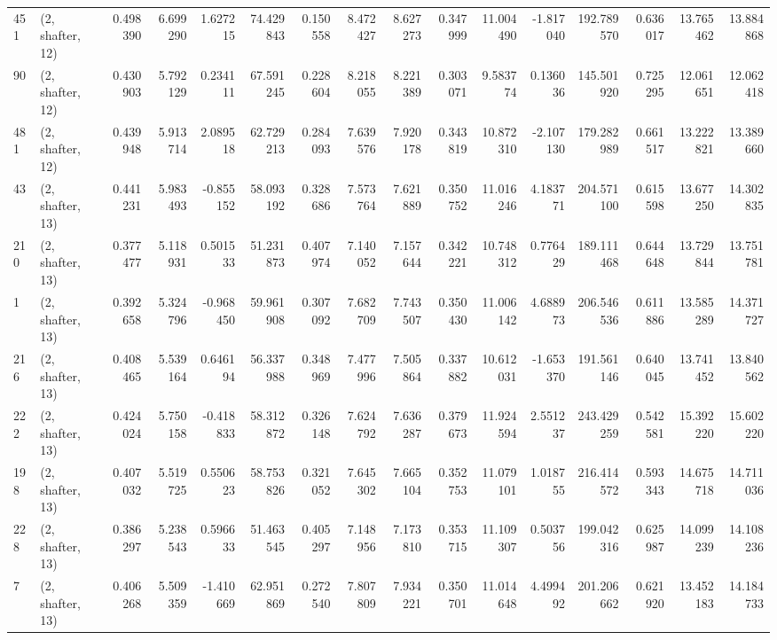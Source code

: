 \begin{tabular}{llrrrrrrrrrrrrrr}
451 &  (2, shafter, 12) &   0.498390 &   6.699290 &   1.627215 &    74.429843 &   0.150558 &   8.472427 &   8.627273 &  0.347999 &  11.004490 &  -1.817040 &   192.789570 &   0.636017 &  13.765462 &  13.884868 \\
90  &  (2, shafter, 12) &   0.430903 &   5.792129 &   0.234111 &    67.591245 &   0.228604 &   8.218055 &   8.221389 &  0.303071 &   9.583774 &   0.136036 &   145.501920 &   0.725295 &  12.061651 &  12.062418 \\
481 &  (2, shafter, 12) &   0.439948 &   5.913714 &   2.089518 &    62.729213 &   0.284093 &   7.639576 &   7.920178 &  0.343819 &  10.872310 &  -2.107130 &   179.282989 &   0.661517 &  13.222821 &  13.389660 \\
43  &  (2, shafter, 13) &   0.441231 &   5.983493 &  -0.855152 &    58.093192 &   0.328686 &   7.573764 &   7.621889 &  0.350752 &  11.016246 &   4.183771 &   204.571100 &   0.615598 &  13.677250 &  14.302835 \\
210 &  (2, shafter, 13) &   0.377477 &   5.118931 &   0.501533 &    51.231873 &   0.407974 &   7.140052 &   7.157644 &  0.342221 &  10.748312 &   0.776429 &   189.111468 &   0.644648 &  13.729844 &  13.751781 \\
1   &  (2, shafter, 13) &   0.392658 &   5.324796 &  -0.968450 &    59.961908 &   0.307092 &   7.682709 &   7.743507 &  0.350430 &  11.006142 &   4.688973 &   206.546536 &   0.611886 &  13.585289 &  14.371727 \\
216 &  (2, shafter, 13) &   0.408465 &   5.539164 &   0.646194 &    56.337988 &   0.348969 &   7.477996 &   7.505864 &  0.337882 &  10.612031 &  -1.653370 &   191.561146 &   0.640045 &  13.741452 &  13.840562 \\
222 &  (2, shafter, 13) &   0.424024 &   5.750158 &  -0.418833 &    58.312872 &   0.326148 &   7.624792 &   7.636287 &  0.379673 &  11.924594 &   2.551237 &   243.429259 &   0.542581 &  15.392220 &  15.602220 \\
198 &  (2, shafter, 13) &   0.407032 &   5.519725 &   0.550623 &    58.753826 &   0.321052 &   7.645302 &   7.665104 &  0.352753 &  11.079101 &   1.018755 &   216.414572 &   0.593343 &  14.675718 &  14.711036 \\
228 &  (2, shafter, 13) &   0.386297 &   5.238543 &   0.596633 &    51.463545 &   0.405297 &   7.148956 &   7.173810 &  0.353715 &  11.109307 &   0.503756 &   199.042316 &   0.625987 &  14.099239 &  14.108236 \\
7   &  (2, shafter, 13) &   0.406268 &   5.509359 &  -1.410669 &    62.951869 &   0.272540 &   7.807809 &   7.934221 &  0.350701 &  11.014648 &   4.499492 &   201.206662 &   0.621920 &  13.452183 &  14.184733 \\

\end{tabular}
